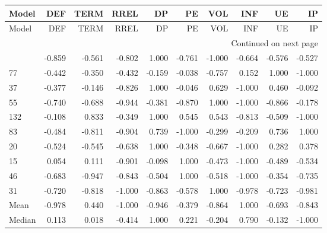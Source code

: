 \begin{longtable}{lrrrrrrrrr}
\label{tab:Shapley_loss_standardised_10_10}\\
\toprule
 Model &    DEF &   TERM &   RREL &     DP &     PE &    VOL &    INF &     UE &     IP \\
\midrule
\endfirsthead

\toprule
 Model &    DEF &   TERM &   RREL &     DP &     PE &    VOL &    INF &     UE &     IP \\
\midrule
\endhead
\midrule
\multicolumn{10}{r}{{Continued on next page}} \\
\midrule
\endfoot

\bottomrule
\endlastfoot
    23 & -0.859 & -0.561 & -0.802 &  1.000 & -0.761 & -1.000 & -0.664 & -0.576 & -0.527 \\
    77 & -0.442 & -0.350 & -0.432 & -0.159 & -0.038 & -0.757 &  0.152 &  1.000 & -1.000 \\
    37 & -0.377 & -0.146 & -0.826 &  1.000 & -0.046 &  0.629 & -1.000 &  0.460 & -0.092 \\
    55 & -0.740 & -0.688 & -0.944 & -0.381 & -0.870 &  1.000 & -1.000 & -0.866 & -0.178 \\
   132 & -0.108 &  0.833 & -0.349 &  1.000 &  0.545 &  0.543 & -0.813 & -0.509 & -1.000 \\
    83 & -0.484 & -0.811 & -0.904 &  0.739 & -1.000 & -0.299 & -0.209 &  0.736 &  1.000 \\
    20 & -0.524 & -0.545 & -0.638 &  1.000 & -0.348 & -0.667 & -1.000 &  0.282 &  0.378 \\
    15 &  0.054 &  0.111 & -0.901 & -0.098 &  1.000 & -0.473 & -1.000 & -0.489 & -0.534 \\
    46 & -0.683 & -0.947 & -0.843 & -0.504 &  1.000 & -0.518 & -1.000 & -0.354 & -0.735 \\
    31 & -0.720 & -0.818 & -1.000 & -0.863 & -0.578 &  1.000 & -0.978 & -0.723 & -0.981 \\
  Mean & -0.978 &  0.440 & -1.000 & -0.946 & -0.379 & -0.864 &  1.000 & -0.693 & -0.843 \\
Median &  0.113 &  0.018 & -0.414 &  1.000 &  0.221 & -0.204 &  0.790 & -0.132 & -1.000 \\
\end{longtable}
